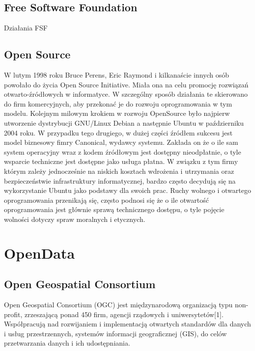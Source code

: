 \subsection{Free Software Foundation}
Działania FSF
\subsection{Open Source}
	W lutym 1998 roku Bruce Perens, Eric Raymond i kilkanaście innych osób powołało do życia Open Source Initiative. Miała ona na celu promocję rozwiązań otwarto-źródłowych w informatyce. W szczególny sposób działania te skierowano do firm komercyjnych, aby przekonać je do rozwoju oprogramowania w tym modelu.
	Kolejnym milowym krokiem w rozwoju OpenSource było najpierw utworzenie dystrybucji GNU/Linux Debian a następnie Ubuntu w październiku 2004 roku. W przypadku tego drugiego, w dużej części źródłem sukcesu jest model biznesowy fimry Canonical, wydawcy systemu. Zakłada on że o ile sam system operacyjny wraz z kodem źródłowym jest dostępny nieodpłatnie, o tyle wsparcie techniczne jest dostępne jako usługa płatna. W związku z tym firmy którym zależy jednocześnie na niskich kosztach wdrożenia i utrzymania oraz bezpieczeństwie infrastruktury informatycznej, bardzo często decydują się na wykorzystanie Ubuntu jako podstawy dla swoich prac.
	Ruchy wolnego i otwartego oprogramowania przenikają się, często podnosi się że o ile otwartość oprogramowania jest głównie sprawą technicznego dostępu, o tyle pojęcie wolności dotyczy spraw moralnych i etycznych.
\section{OpenData}
\subsection{Open Geospatial Consortium}
Open Geospatial Consortium (OGC) jest międzynarodową organizacją typu non-profit, zrzeszającą ponad 450 firm, agencji rządowych i uniwersytetów[1]. Współpracują nad rozwijaniem i implementacją otwartych standardów dla danych i usług przestrzennych, systemów informacji geograficznej (GIS), do celów przetwarzania danych i ich udostępniania.

